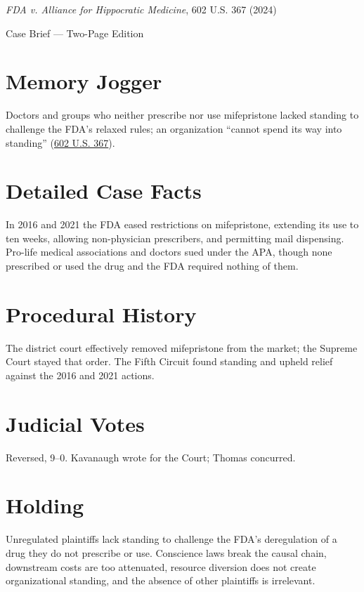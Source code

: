 \documentclass[12pt]{article}
\begin{document}
\begin{center}
{\LARGE \textit{FDA v. Alliance for Hippocratic Medicine}, 602 U.S. 367 (2024)\par}
\vspace{0.5em}
{\large Case Brief --- Two-Page Edition\par}
\end{center}

\section{Memory Jogger}
Doctors and groups who neither prescribe nor use mifepristone lacked standing to challenge the FDA's relaxed rules; an organization ``cannot spend its way into standing'' (\href{https://www.supremecourt.gov/opinions/23pdf/602us1r35_bqmd.pdf}{602 U.S. 367}).

\section{Detailed Case Facts}
In 2016 and 2021 the FDA eased restrictions on mifepristone, extending its use to ten weeks, allowing non-physician prescribers, and permitting mail dispensing. Pro-life medical associations and doctors sued under the APA, though none prescribed or used the drug and the FDA required nothing of them.

\section{Procedural History}
The district court effectively removed mifepristone from the market; the Supreme Court stayed that order. The Fifth Circuit found standing and upheld relief against the 2016 and 2021 actions.

\section{Judicial Votes}
Reversed, 9--0. Kavanaugh wrote for the Court; Thomas concurred.

\section{Holding}
Unregulated plaintiffs lack standing to challenge the FDA's deregulation of a drug they do not prescribe or use. Conscience laws break the causal chain, downstream costs are too attenuated, resource diversion does not create organizational standing, and the absence of other plaintiffs is irrelevant.
\end{document}
